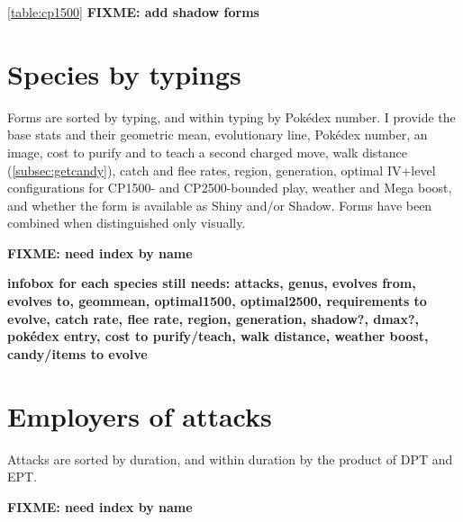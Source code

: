 \documentclass[ebook,10pt,openany,oneside]{memoir}
\begin{document}
\autoref{table:cp1500}
\textbf{FIXME: add shadow forms}


\chapter{Species by typings}
\label{chap:speciesbytype}
Forms are sorted by typing, and within typing by Pokédex number.
I provide the base stats and their geometric mean, evolutionary line,
 Pokédex number, an image, cost to purify and to teach a second charged
 move, walk distance (\autoref{subsec:getcandy}), catch and flee rates,
 region, generation, optimal IV+level configurations for CP1500-
 and CP2500-bounded play, weather and Mega boost, and whether the
 form is available as Shiny and/or Shadow.
Forms have been combined when distinguished only visually.

\textbf{FIXME: need index by name}

\textbf{infobox for each species still needs: attacks, genus, evolves from, evolves to, geommean, optimal1500, optimal2500,
           requirements to evolve, catch rate, flee rate, region, generation, shadow?, dmax?,
           pokédex entry, cost to purify/teach, walk distance, weather boost, candy/items to evolve}

\chapter{Employers of attacks}
\label{chap:attackemployers}
Attacks are sorted by duration, and within duration by the product of DPT and EPT.

\textbf{FIXME: need index by name}
\end{document}
